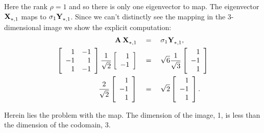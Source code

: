 Here the rank $\rho=1$ and so there is only one eigenvector to map. The eigenvector $\X{}_{*,1}$ maps to $\sigma_{1}\Y{}_{*,1}$. Since we can't distinctly see the mapping in the 3-dimensional image we show the explicit computation:
\begin{equation}
  \begin{split}
    \A{}\,\X{}_{*,1}\quad &= \quad \sigma_{1}\Y{}_{*,1}, \\
    \Aexample \frac{1}{\sqrt{2}}\mat{r}{1\\-1} \quad & =  \quad \sqrt{6}\frac{1}{\sqrt{3}}\mat{r}{1\\-1\\1}\\
    \frac{2}{\sqrt{2}}\mat{r}{1\\-1\\1}  \quad & =  \quad \sqrt{2}\mat{r}{1\\-1\\1}.
  \end{split}
\end{equation}

Herein lies the problem with the map. The dimension of the image, 1, is less than the dimension of the codomain, 3.

